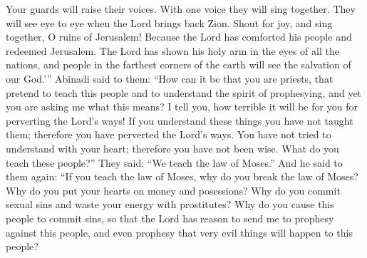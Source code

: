 \bverse \iffalse Thy watchmen shall lift up the voice; with the voice together shall they sing; for they shall see eye to eye when the Lord shall bring again Zion; \fi
Your guards will raise their voices. With one voice they will sing together. They will see eye to eye when the Lord brings back Zion.
\bverse \iffalse Break forth into joy; sing together ye waste places of Jerusalem; for the Lord hath comforted his people, he hath redeemed Jerusalem; \fi
Shout for joy, and sing together, O ruins of Jerusalem! Because the Lord has comforted his people and redeemed Jerusalem.
\bverse \iffalse The Lord hath made bare his holy arm in the eyes of all the nations, and all the ends of the earth shall see the salvation of our God? \fi
The Lord has shown his holy arm in the eyes of all the nations, and people in the farthest corners of the earth will see the salvation of our God.\rq ''
\bverse \iffalse And now Abinadi said unto them: Are you priests, and pretend to teach this people, and to understand the spirit of prophesying, and yet desire to know of me what these things mean? \fi
Abinadi said to them: ``How can it be that you are priests, that pretend to teach this people and to understand the spirit of prophesying, and yet you are asking me what this means? 
\bverse \iffalse I say unto you, wo be unto you for perverting the ways of the Lord! For if ye understand these things ye have not taught them; therefore, ye have perverted the ways of the Lord. \fi
I tell you, how terrible it will be for you for perverting the Lord's ways! If you understand these things you have not taught them; therefore you have perverted the Lord's ways.
\bverse \iffalse Ye have not applied your hearts to understanding; therefore, ye have not been wise. Therefore, what teach ye this people? \fi
You have not tried to understand with your heart; therefore you have not been wise. What do you teach these people?''
\bverse \iffalse And they said: We teach the law of Moses. \fi
They said: ``We teach the law of Moses.''
\bverse \iffalse And again he said unto them: If ye teach the law of Moses why do ye not keep it? Why do ye set your hearts upon riches? Why do ye commit whoredoms and spend your strength with harlots, yea, and cause this people to commit sin, that the Lord has cause to send me to prophesy against this people, yea, even a great evil against this people? \fi
And he said to them again: ``If you teach the law of Moses, why do you break the law of Moses? Why do you put your hearts on money and posessions? Why do you commit sexual sins and waste your energy with prostitutes? Why do you cause this people to commit sins, so that the Lord has reason to send me to prophesy against this people, and even prophesy that very evil things will happen to this people?
